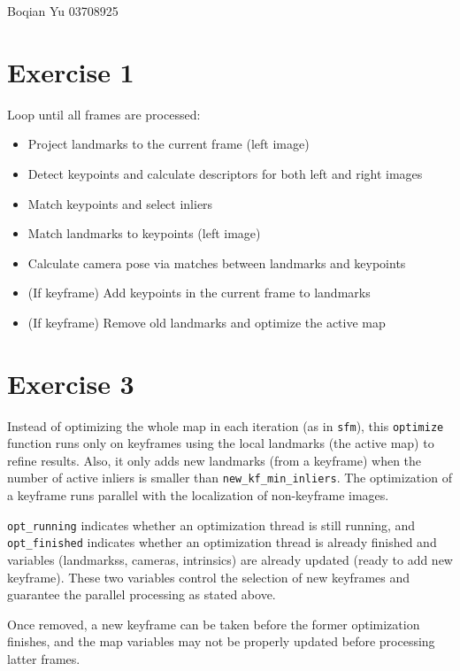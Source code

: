 \documentclass[a4paper, 12pt]{article}
\begin{document}
    Boqian Yu 03708925
	\section{Exercise 1}
        Loop until all frames are processed:
        \begin{itemize}
            \item Project landmarks to the current frame (left image)
            \item Detect keypoints and calculate descriptors for both left and right images
            \item Match keypoints and select inliers
            \item Match landmarks to keypoints (left image)
            \item Calculate camera pose via matches between landmarks and keypoints
            \item (If keyframe) Add keypoints in the current frame to landmarks
            \item (If keyframe) Remove old landmarks and optimize the active map
        \end{itemize}
        
    \section{Exercise 3}
        Instead of optimizing the whole map in each iteration (as in \texttt{sfm}), this \texttt{optimize} function runs only on keyframes using the local landmarks (the active map) to refine results. Also, it only adds new landmarks (from a keyframe) when the number of active inliers is smaller than \texttt{new\_kf\_min\_inliers}. The optimization of a keyframe runs parallel with the localization of non-keyframe images.
        
        \texttt{opt\_running} indicates whether an optimization thread is still running, and \texttt{opt\_finished} indicates whether an optimization thread is already finished and variables (landmarkss, cameras, intrinsics) are already updated (ready to add new keyframe). These two variables control the selection of new keyframes and guarantee the parallel processing as stated above.
        
        Once removed, a new keyframe can be taken before the former optimization finishes, and the map variables may not be properly updated before processing latter frames.
\end{document}
